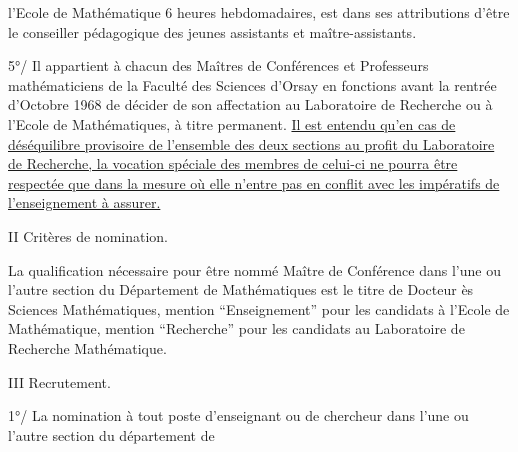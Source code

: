 
l'Ecole de Mathématique  6 heures hebdomadaires, est dans ses attributions d'être le conseiller pédagogique des jeunes assistants et maître-assistants.

5°/ Il appartient à chacun des Maîtres de Conférences et Professeurs mathématiciens de la Faculté des Sciences d'Orsay en fonctions avant la rentrée d'Octobre 1968 de décider de son affectation au Laboratoire de Recherche ou à l'Ecole de Mathématiques, à titre permanent. \uline{Il est entendu qu'en cas de déséquilibre provisoire de l'ensemble des deux sections au profit du Laboratoire de Recherche, la vocation spéciale des membres de celui-ci ne pourra être respectée que dans la mesure où elle n'entre pas en conflit avec les impératifs de l'enseignement à assurer.}

II Critères de nomination.

La qualification nécessaire pour être nommé Maître de Conférence dans l'une ou l'autre section du Département de Mathématiques est le titre de Docteur ès Sciences Mathématiques, mention ``Enseignement'' pour les candidats à l'Ecole de Mathématique, mention ``Recherche'' pour les candidats au Laboratoire de Recherche Mathématique.

III Recrutement.

1°/ La nomination à tout poste d'enseignant ou de chercheur dans l'une ou l'autre section du département de
